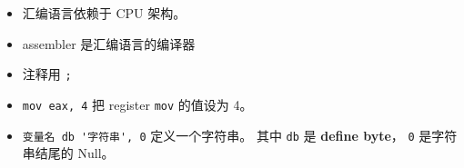 
\begin{issues}
\issueDraft
\end{issues}

\begin{itemize}
\item 汇编语言依赖于 CPU 架构。
\item assembler 是汇编语言的编译器
\item 注释用 \verb|;|
\item \verb|mov eax, 4| 把 register \verb|mov| 的值设为 4。
\item \verb|变量名 db '字符串', 0| 定义一个字符串。 其中 \verb|db| 是 \textbf{define byte}， \verb|0| 是字符串结尾的 Null。
\end{itemize}
